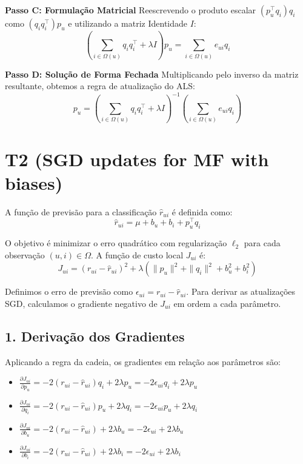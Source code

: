 \textbf{Passo C: Formulação Matricial}
Reescrevendo o produto escalar $(p_u^\top q_i)q_i$ como $(q_i q_i^\top) p_u$ e utilizando a matriz Identidade $I$:
\begin{equation}
\left( \sum_{i \in \Omega(u)} q_i q_i^\top + \lambda I \right) p_u = \sum_{i \in \Omega(u)} e_{ui} q_i
\end{equation}

\textbf{Passo D: Solução de Forma Fechada}
Multiplicando pelo inverso da matriz resultante, obtemos a regra de atualização do ALS:
\begin{equation}
p_u = \left( \sum_{i \in \Omega(u)} q_i q_i^\top + \lambda I \right)^{-1} \left( \sum_{i \in \Omega(u)} e_{ui} q_i \right)
\end{equation}

\section*{T2 (SGD updates for MF with biases)}

A função de previsão para a classificação $\hat{r}_{ui}$ é definida como:
\begin{equation}
\hat{r}_{ui} = \mu + b_u + b_i + p_u^\top q_i
\end{equation}

O objetivo é minimizar o erro quadrático com regularização $\ell_2$ para cada observação $(u, i) \in \Omega$. A função de custo local $J_{ui}$ é:
\begin{equation}
J_{ui} = (r_{ui} - \hat{r}_{ui})^2 + \lambda (\|p_u\|^2 + \|q_i\|^2 + b_u^2 + b_i^2)
\end{equation}

Definimos o erro de previsão como $\epsilon_{ui} = r_{ui} - \hat{r}_{ui}$. Para derivar as atualizações SGD, calculamos o gradiente negativo de $J_{ui}$ em ordem a cada parâmetro.

\subsection*{1. Derivação dos Gradientes}
Aplicando a regra da cadeia, os gradientes em relação aos parâmetros são:
\begin{itemize}
    \item $\frac{\partial J_{ui}}{\partial p_u} = -2(r_{ui} - \hat{r}_{ui})q_i + 2\lambda p_u = -2\epsilon_{ui}q_i + 2\lambda p_u$
    \item $\frac{\partial J_{ui}}{\partial q_i} = -2(r_{ui} - \hat{r}_{ui})p_u + 2\lambda q_i = -2\epsilon_{ui}p_u + 2\lambda q_i$
    \item $\frac{\partial J_{ui}}{\partial b_u} = -2(r_{ui} - \hat{r}_{ui}) + 2\lambda b_u = -2\epsilon_{ui} + 2\lambda b_u$
    \item $\frac{\partial J_{ui}}{\partial b_i} = -2(r_{ui} - \hat{r}_{ui}) + 2\lambda b_i = -2\epsilon_{ui} + 2\lambda b_i$
\end{itemize}


